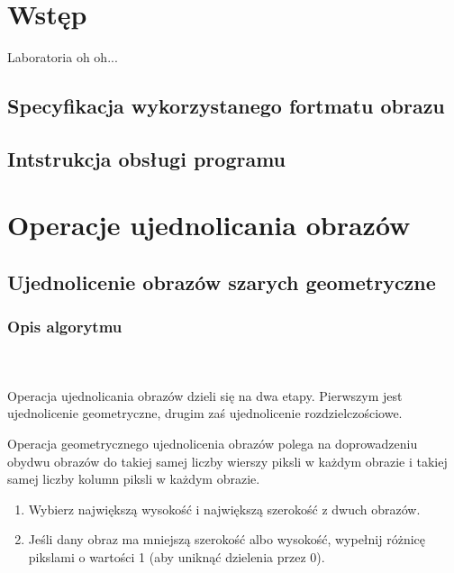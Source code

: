 \documentclass[final,a4paper,openany,12pt]{mwbk}
\begin{document}
\tableofcontents
\listoffigures

\sloppy


\chapter {Wstęp}

Laboratoria oh oh...~\cite{BookMok} %


\section {Specyfikacja wykorzystanego fortmatu obrazu}

\section {Intstrukcja obsługi programu}



\chapter{Operacje ujednolicania obrazów}
\newpage

\section{Ujednolicenie obrazów szarych geometryczne}
\subsection*{Opis algorytmu}
\hfill
\\\\
\indent Operacja ujednolicania obrazów dzieli się na dwa etapy. Pierwszym jest ujednolicenie geometryczne, drugim zaś ujednolicenie rozdzielczościowe.

Operacja geometrycznego ujednolicenia obrazów polega na doprowadzeniu obydwu obrazów do takiej samej liczby wierszy piksli w każdym obrazie i takiej samej liczby kolumn piksli w każdym obrazie.
\begin{enumerate}
	\item Wybierz największą wysokość i największą szerokość z dwuch obrazów.\\
	\item Jeśli dany obraz ma mniejszą szerokość albo wysokość, wypełnij różnicę pikslami o wartości 1 (aby uniknąć dzielenia przez 0).
\end{enumerate}
\end{document}
